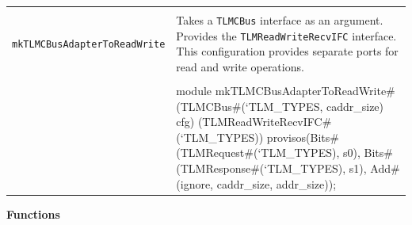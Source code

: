 \documentclass[twoside,letterpaper]{article}
\newcommand{\te}[1]{\texttt{#1}}
\newenvironment{libverbatim}
  {\vspace*{-1.0em}
   \verbatim}
  {\endverbatim
  }
\begin{document}
\begin{center}
\begin{tabular}{|p{2 in}|p{4.2 in}|}
\hline 
&\\
\te{mkTLMCBusAdapterToReadWrite}&Takes a \te{TLMCBus} interface as an argument.
Provides the \te{TLMReadWriteRecvIFC} interface. This configuration provides 
separate ports for read and write operations.\\ 
&\\
\cline{2-2}
&\begin{libverbatim}
module mkTLMCBusAdapterToReadWrite#
                  (TLMCBus#(`TLM_TYPES, caddr_size) cfg)
                  (TLMReadWriteRecvIFC#(`TLM_TYPES))
   provisos(Bits#(TLMRequest#(`TLM_TYPES),  s0),
	    Bits#(TLMResponse#(`TLM_TYPES), s1),
	    Add#(ignore, caddr_size, addr_size));
\end{libverbatim}
\\
\hline
\end{tabular}
\end{center}


{\bf Functions}



\end{document}
